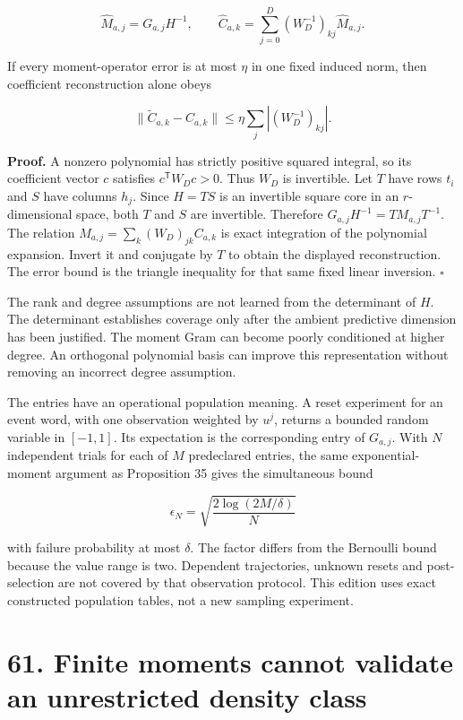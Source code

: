 \documentclass[11pt,letterpaper]{article}
\begin{document}
\[
\boxed{
\widehat M_{a,j}=G_{a,j}H^{-1},
\qquad
\widehat C_{a,k}=\sum_{j=0}^D(W_D^{-1})_{kj}\widehat M_{a,j}.
}
\]

If every moment-operator error is at most \(\eta\) in one fixed induced
norm, then coefficient reconstruction alone obeys

\[
\|\widetilde C_{a,k}-\widehat C_{a,k}\|
\leq\eta\sum_j|(W_D^{-1})_{kj}|.
\]

\textbf{Proof.} A nonzero polynomial has strictly positive squared
integral, so its coefficient vector \(c\) satisfies
\(c^{\mathsf T}W_Dc>0\). Thus \(W_D\) is invertible. Let \(T\) have rows
\(t_i\) and \(S\) have columns \(h_j\). Since \(H=TS\) is an invertible
square core in an \(r\)-dimensional space, both \(T\) and \(S\) are
invertible. Therefore \(G_{a,j}H^{-1}=TM_{a,j}T^{-1}\). The relation
\(M_{a,j}=\sum_k(W_D)_{jk}C_{a,k}\) is exact integration of the
polynomial expansion. Invert it and conjugate by \(T\) to obtain the
displayed reconstruction. The error bound is the triangle inequality for
that same fixed linear inversion. \(\square\)

The rank and degree assumptions are not learned from the determinant of
\(H\). The determinant establishes coverage only after the ambient
predictive dimension has been justified. The moment Gram can become
poorly conditioned at higher degree. An orthogonal polynomial basis can
improve this representation without removing an incorrect degree
assumption.

The entries have an operational population meaning. A reset experiment
for an event word, with one observation weighted by \(u^j\), returns a
bounded random variable in \([-1,1]\). Its expectation is the
corresponding entry of \(G_{a,j}\). With \(N\) independent trials for
each of \(M\) predeclared entries, the same exponential-moment argument
as Proposition 35 gives the simultaneous bound

\[
\epsilon_N=\sqrt{\frac{2\log(2M/\delta)}{N}}
\]

with failure probability at most \(\delta\). The factor differs from the
Bernoulli bound because the value range is two. Dependent trajectories,
unknown resets and post-selection are not covered by that observation
protocol. This edition uses exact constructed population tables, not a
new sampling experiment.

\section{61. Finite moments cannot validate an unrestricted density
class}\label{finite-moments-cannot-validate-an-unrestricted-density-class}
\end{document}
